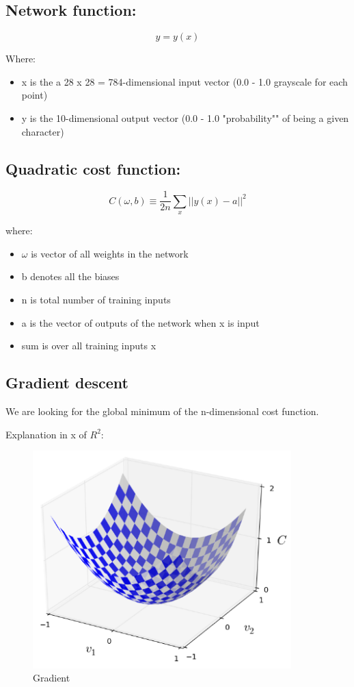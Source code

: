 \documentclass[10pt,a4paper]{article}
\begin{document}
\subsection{Network function:}

$$ y = y(x) $$

Where:

\begin{itemize}
\item x is the a 28 x 28 = 784-dimensional input vector (0.0 - 1.0 grayscale for each point)
\item y is the 10-dimensional output vector (0.0 - 1.0 "probability"" of being a given character)
\end{itemize}

\subsection{Quadratic cost function:}

$$ C(\omega, b) \equiv \frac{1}{2n} \sum_x || y(x) - a ||^2 $$

where:
\begin{itemize}
\item $\omega$ is vector of all weights in the network 
\item b denotes all the biases
\item n is total number of training inputs
\item a is the vector of outputs of the network when x is input
\item sum is over all training inputs x
\end{itemize}

\subsection{Gradient descent}

We are looking for the global minimum of the n-dimensional cost function.

Explanation in x of $R^2$:

\begin{figure}[H]
\centering
\includegraphics[width=10cm]{gradient.png}
\caption{Gradient}
\end{figure}
\end{document}

